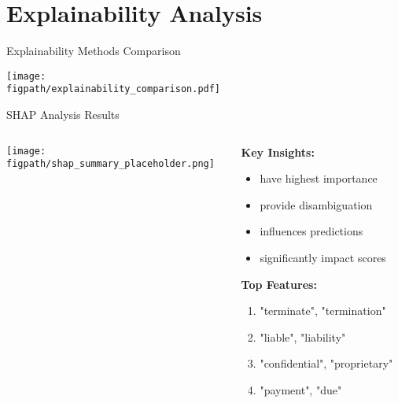 
\section{Explainability Analysis}

\begin{frame}{Explainability Methods Comparison}
\begin{center}
\texttt{[image: \\figpath/explainability\_comparison.pdf]}
\end{center}
\end{frame}

\begin{frame}{SHAP Analysis Results}
\begin{columns}
\begin{column}{0.6\textwidth}
\begin{center}
\texttt{[image: \\figpath/shap\_summary\_placeholder.png]}
\end{center}
\end{column}
\begin{column}{0.4\textwidth}
\textbf{Key Insights:}
\begin{itemize}
    \item {} have highest importance
    \item {} provide disambiguation
    \item {} influences predictions
    \item {} significantly impact scores
\end{itemize}

\vspace{0.5cm}
\textbf{Top Features:}
\begin{enumerate}
    \item "terminate", "termination"
    \item "liable", "liability" 
    \item "confidential", "proprietary"
    \item "payment", "due"
\end{enumerate}
\end{column}
\end{columns}
\end{frame}

